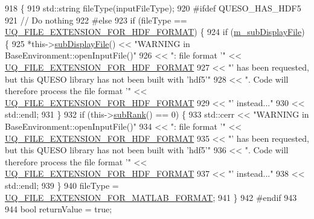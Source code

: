 \begin{DoxyCode}
918 \{
919   std::string fileType(inputFileType);
920 \textcolor{preprocessor}{#ifdef QUESO\_HAS\_HDF5}
921 \textcolor{preprocessor}{}  \textcolor{comment}{// Do nothing}
922 \textcolor{preprocessor}{#else}
923 \textcolor{preprocessor}{}  \textcolor{keywordflow}{if} (fileType == \hyperlink{_defines_8h_a4ebcc075277d031eb97c90b9a45f4493}{UQ\_FILE\_EXTENSION\_FOR\_HDF\_FORMAT}) \{
924     \textcolor{keywordflow}{if} (\hyperlink{class_q_u_e_s_o_1_1_base_environment_a52b4275aa8ee85994dd304d9fe95c9c5}{m\_subDisplayFile}) \{
925       *this->\hyperlink{class_q_u_e_s_o_1_1_base_environment_a8a0064746ae8dddfece4229b9ad374d6}{subDisplayFile}() << \textcolor{stringliteral}{"WARNING in BaseEnvironment::openInputFile()"}
926                               << \textcolor{stringliteral}{": file format '"} << 
      \hyperlink{_defines_8h_a4ebcc075277d031eb97c90b9a45f4493}{UQ\_FILE\_EXTENSION\_FOR\_HDF\_FORMAT}
927                               << \textcolor{stringliteral}{"' has been requested, but this QUESO library has not been built with
       'hdf5'"}
928                               << \textcolor{stringliteral}{". Code will therefore process the file format '"} << 
      \hyperlink{_defines_8h_a4ebcc075277d031eb97c90b9a45f4493}{UQ\_FILE\_EXTENSION\_FOR\_HDF\_FORMAT}
929                               << \textcolor{stringliteral}{"' instead..."}
930                               << std::endl;
931     \}
932     \textcolor{keywordflow}{if} (this->\hyperlink{class_q_u_e_s_o_1_1_base_environment_a172d52f993f1322ed45aaddf71518dbb}{subRank}() == 0) \{
933       std::cerr << \textcolor{stringliteral}{"WARNING in BaseEnvironment::openInputFile()"}
934                 << \textcolor{stringliteral}{": file format '"} << \hyperlink{_defines_8h_a4ebcc075277d031eb97c90b9a45f4493}{UQ\_FILE\_EXTENSION\_FOR\_HDF\_FORMAT}
935                 << \textcolor{stringliteral}{"' has been requested, but this QUESO library has not been built with 'hdf5'"}
936                 << \textcolor{stringliteral}{". Code will therefore process the file format '"} << 
      \hyperlink{_defines_8h_a4ebcc075277d031eb97c90b9a45f4493}{UQ\_FILE\_EXTENSION\_FOR\_HDF\_FORMAT}
937                 << \textcolor{stringliteral}{"' instead..."}
938                 << std::endl;
939     \}
940     fileType = \hyperlink{_defines_8h_ac440026eff7deb1c1eed1eea0e8e36ba}{UQ\_FILE\_EXTENSION\_FOR\_MATLAB\_FORMAT};
941   \}
942 \textcolor{preprocessor}{#endif}
943 \textcolor{preprocessor}{}
944   \textcolor{keywordtype}{bool} returnValue = \textcolor{keyword}{true};

\end{DoxyCode}
